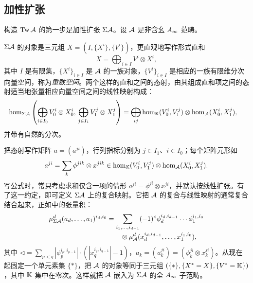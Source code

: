 \subsection{加性扩张}\label{sec:3k}
构造 $\operatorname{Tw}\mathcal A$ 的第一步是加性扩张 $\Sigma\mathcal A$。设 $\mathcal A$ 是非含幺 $A_\infty$ 范畴。
\begin{definition*}
$\Sigma\mathcal A$ 的对象是三元组
$X=(I,\{X^i\},\{V^i\})$，更直观地写作形式直和
\begin{equation}\label{eq:3.15}
X=\bigoplus_{i\in I}V^i\otimes X^i,
\end{equation}
其中 $I$ 是有限集，$\{X^i\}_{i\in I}$ 是 $\mathcal A$ 的一族对象，$\{V^i\}_{i\in I}$ 是相应的一族有限维分次向量空间，称为\emph{重数空间}。两个这样的直和之间的态射，由其组成直和项之间的态射适当地张量相应向量空间之间的线性映射构成：
\begin{equation}\label{eq:3.16}
\begin{aligned}
\hom_{\Sigma\mathcal A}\left(\bigoplus_{i\in I_0}V_0^i\otimes X_0^i,\,\bigoplus_{j\in I_1}V_1^j\otimes X_1^j\right)
&=\bigoplus_{ij}\hom_{\mathbb K}(V_0^i,V_1^j)\otimes\hom_{\mathcal A}(X_0^i,X_1^j),
\end{aligned}
\end{equation}
并带有自然的分次。
\end{definition*}
把态射写作矩阵 $a=(a^{ji})$，行列指标分别为 $j\in I_1$、$i\in I_0$；每个矩阵元形如
\[
a^{ji}=\sum_k\phi^{jik}\otimes x^{jik}\in\hom_{\mathbb K}(V_0^i,V_1^j)\otimes\hom_{\mathcal A}(X_0^i,X_1^j).
\]
写公式时，常只考虑求和仅含一项的情形 $a^{ji}=\phi^{ji}\otimes x^{ji}$，并默认按线性扩张。有了这一约定，即可定义 $\Sigma\mathcal A$ 上的复合映射。它把 $\mathcal A$ 的复合与线性映射的通常复合结合起来，正如中的张量积：
\begin{equation}\label{eq:3.17}
\begin{aligned}
\mu^d_{\Sigma\mathcal A}(a_d,\ldots,a_1)^{i_d,i_0}
&=\sum_{i_1,\ldots,i_{d-1}}(-1)^{\triangleleft}\phi_d^{i_d,i_{d-1}}\cdots\phi_1^{i_1,i_0}\\[-2pt]
&\qquad\otimes\mu^d_{\mathcal A}(x_d^{i_d,i_{d-1}},\ldots,x_1^{i_1,i_0}),
\end{aligned}
\end{equation}
其中 $\triangleleft=\sum_{p<q}|\phi_p^{i_p,i_{p-1}}|\cdot(|x_q^{i_q,i_{q-1}}|-1)$，$a_k=(a_k^{ji})=(\phi_k^{ji}\otimes x_k^{ji})$。从现在起固定一个单元素集 $\{*\}$，把 $\mathcal A$ 的对象等同于三元组 $(\{*\},\{X^*=X\},\{V^*=\mathbb K\})$，其中 $\mathbb K$ 集中在零次。这样就把 $\mathcal A$ 嵌入为 $\Sigma\mathcal A$ 的全 $A_\infty$ 子范畴。

